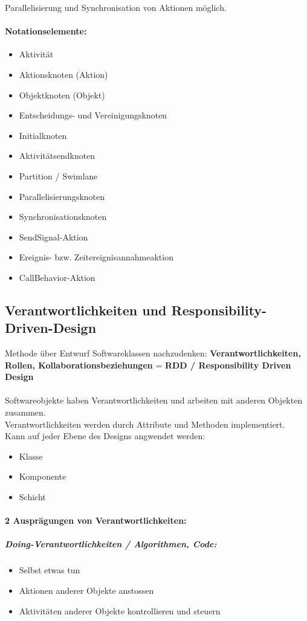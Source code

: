 \documentclass[../ZF_SWEN1.tex]{subfiles}
\begin{document}
Parallelisierung und Synchronisation von Aktionen möglich.

\paragraph{Notationselemente:}
\begin{itemize}
	\item Aktivität
	\item Aktionsknoten (Aktion)
	\item Objektknoten (Objekt)
	\item Entscheidungs- und Vereinigungsknoten
	\item Initialknoten
	\item Aktivitätsendknoten
	\item Partition / Swimlane
	\item Parallelisierungsknoten
	\item Synchronisationsknoten
	\item SendSignal-Aktion
	\item Ereignis- bzw. Zeitereignisannahmeaktion
	\item CallBehavior-Aktion
\end{itemize}


\subsection{Verantwortlichkeiten und Responsibility-Driven-Design}
Methode über Entwurf Softwareklassen nachzudenken:
\textcolor {YellowOrange} {\textbf{Verantwortlichkeiten, Rollen, Kollaborationsbeziehungen}} = \textbf{RDD / Responsibility Driven Design}\\ \\
Softwareobjekte haben Verantwortlichkeiten und arbeiten mit anderen Objekten zusammen.\\
Verantwortlichkeiten werden durch Attribute und Methoden implementiert.\\
Kann auf jeder Ebene des Designs angwendet werden:
\begin{itemize}
	\item Klasse
	\item Komponente
	\item Schicht
\end{itemize}


\paragraph{2 Ausprägungen von Verantwortlichkeiten:}
\subparagraph{\textcolor {BrickRed}{\textbf{Doing-Verantwortlichkeiten / Algorithmen, Code:}}}
\begin{itemize}
	\item Selbst etwas tun
	\item Aktionen anderer Objekte anstossen
	\item Aktivitäten anderer Objekte kontrollieren und steuern
\end{itemize}
\end{document}
